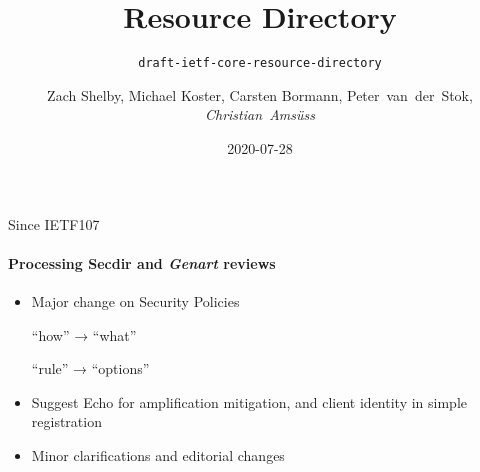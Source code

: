\documentclass[aspectratio=169]{beamer}
\title{Resource Directory}
\subtitle{\texttt{draft-ietf-core-resource-directory}}
\author{Zach Shelby, Michael Koster, Carsten Bormann, Peter~van~der~Stok, \textit{Christian~Amsüss}}
\date{2020-07-28}
\begin{document}
\frame{\titlepage}

\begin{frame}{Since IETF107}\Large
	\framesubtitle{Processing Secdir and {\em Genart} reviews}

	\begin{itemize}
		\item Major change on Security Policies\bigskip


			“how” → “what”\bigskip

			“rule” → “options”\bigskip

		\item Suggest Echo for amplification mitigation, and client identity in simple registration
		\item Minor clarifications and editorial changes
	\end{itemize}
\end{frame}
\end{document}
